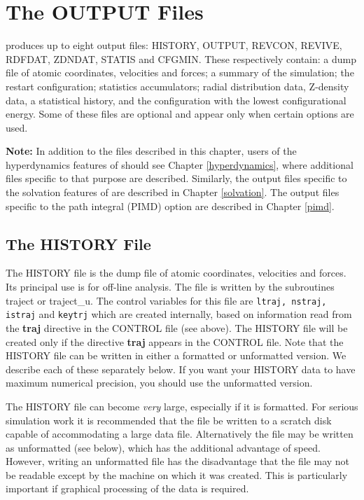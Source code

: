 
\section{The OUTPUT Files}
\label{outputfiles}

\D{} produces up to eight output files: HISTORY, OUTPUT, REVCON, REVIVE,
RDFDAT, ZDNDAT, STATIS and CFGMIN. These respectively contain: a dump file of
atomic coordinates, velocities and forces; a summary of the
simulation; the restart configuration; statistics accumulators; radial
distribution data, Z-density data, a statistical history, and the
configuration with the lowest configurational energy. Some of these
files are optional and appear only when certain options are used.

{\bf Note:} In addition to the files described in this chapter, users
of the hyperdynamics features of \D{} should see Chapter
\ref{hyperdynamics}, where additional files specific to that purpose
are described. Similarly, the output files specific to the solvation
features of \D{} are described in Chapter \ref{solvation}. The output
files specific to the path integral (PIMD) option are described in
Chapter \ref{pimd}.

\subsection{The HISTORY File}
\label{historyfile}

The HISTORY file is the dump file of atomic coordinates, velocities
and forces. Its principal use is for off-line analysis. The file is
written by the subroutines {\sc traject} or {\sc traject\_u}. The
control variables for this file are {\tt ltraj, nstraj, istraj} and
{\tt keytrj} which are created internally, based on information read
from the {\bf traj} directive in the CONTROL file (see above). The
HISTORY file will be created only if the directive {\bf traj} appears
in the CONTROL file.  Note that the HISTORY file can be written in
either a formatted or unformatted version. We describe each of these
separately below. If you want your HISTORY data to have maximum numerical
precision, you should use the unformatted version.

The HISTORY file can become {\em very} large, especially if it is
formatted. For serious simulation work it is recommended that the file
be written to a scratch disk capable of accommodating a large data
file.  Alternatively the file may be written as unformatted (see below),
which has the additional advantage of speed. However, writing an
unformatted file has the disadvantage that the file may not be
readable except by the machine on which it was created. This is
particularly important if graphical processing of the data is
required.

